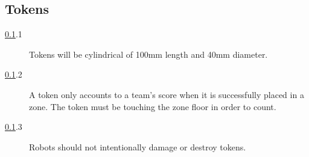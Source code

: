 \subsection {Tokens}
\label{tokens}

\begin {description} 
\item [\ref{tokens}.1] Tokens will be cylindrical of 100mm length and 40mm diameter.
\item [\ref{tokens}.2] A token only accounts to a team's score when it is successfully placed in a zone. The token must be touching the zone floor in order to count.
\item [\ref{tokens}.3] Robots should not intentionally damage or destroy tokens.
\end {description}

